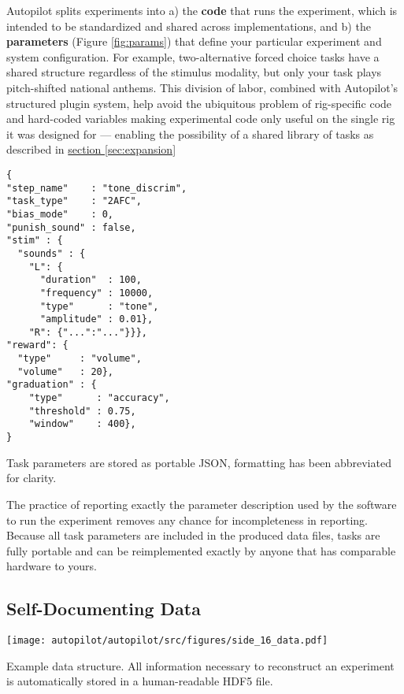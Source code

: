 %
%
%
Autopilot splits experiments into a) the \textbf{code} that runs the experiment, which is intended to be standardized and shared across implementations, and b) the \textbf{parameters} (Figure \ref{fig:params}) that define your particular experiment and system configuration. For example, two-alternative forced choice tasks have a shared structure regardless of the stimulus modality, but only your task plays pitch-shifted national anthems. This division of labor, combined with Autopilot's structured plugin system, help avoid the ubiquitous problem of rig-specific code and hard-coded variables making experimental code only useful on the single rig it was designed for --- enabling the possibility of a shared library of tasks as described in \hyperref[sec:expansion]{section \ref{sec:expansion}}%

\begin{marginfigure}[0cm]
\begin{verbatim}
{
"step_name"    : "tone_discrim",
"task_type"    : "2AFC",
"bias_mode"    : 0,
"punish_sound" : false,
"stim" : {
  "sounds" : {
    "L": {
      "duration"  : 100,
      "frequency" : 10000,
      "type"      : "tone",
      "amplitude" : 0.01},
    "R": {"...":"..."}}},
"reward": {
  "type"     : "volume",
  "volume"   : 20},
"graduation" : {
    "type"      : "accuracy",
    "threshold" : 0.75,
    "window"    : 400},
}
\end{verbatim}
\caption{Task parameters are stored as portable JSON, formatting has been abbreviated for clarity.}
\label{fig:params}
\end{marginfigure}%

The practice of reporting exactly the parameter description used by the software to run the experiment removes any chance for incompleteness in reporting. Because all task parameters are included in the produced data files, tasks are fully portable and can be reimplemented exactly by anyone that has comparable hardware to yours. 

\subsection{Self-Documenting Data}
\label{sec:data}

\begin{marginfigure}[1.5cm]
\texttt{[image: autopilot/autopilot/src/figures/side\_16\_data.pdf]}
\caption{Example data structure. All information necessary to reconstruct an experiment is automatically stored in a human-readable HDF5 file.}
\label{fig:datastx}
\end{marginfigure}

